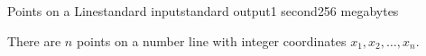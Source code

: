 \begin{problem}{Points on a Line}{standard input}{standard output}{1 second}{256 megabytes}

There are $n$ points on a number line with integer coordinates $x_1, x_2, \ldots, x_n$.

\Example

\begin{example}
%
\end{example}

\end{problem}
